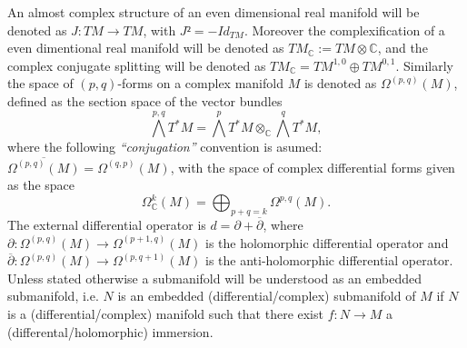 \documentclass[12pt,twoside,a4paper]{report}
\newcommand{\co}{\ensuremath{\mathbb C }}
\newcommand{\om}{\ensuremath{\Omega}}
\begin{document}
An almost complex structure of an even dimensional real manifold will be denoted as $J:TM\rightarrow TM$, with $J²=-Id_{TM}$. Moreover the complexification of a even dimentional real manifold will be denoted as $TM_{\co}:=TM\otimes\co$, and the complex conjugate splitting will be denoted as $TM_{\co}=TM^{1,0}\oplus TM^{0,1}$.
Similarly the space of $(p,q)$-forms on a complex manifold $M$ is denoted as $\Omega^{(p,q)}(M)$, defined as the section space of the vector bundles
\[
  \bigwedge^{p,q}T^{*}M=\bigwedge^{p}T^{*}M\otimes_{\co}\bigwedge^{q}T^{*}M,
\]
\noindent where the following \emph{``conjugation''} convention is asumed: $\overline{\om^{(p,q)}(M)}=\om^{(q,p)}(M)$, with the space of complex differential forms given as the space
\[
  \om^{k}_{\co}(M)=\bigoplus_{p+q=k}\om^{p,q}(M).
\]
\noindent The external differential operator is $d=\partial + \overline{\partial}$, where $\partial:\om^{(p,q)}(M)\rightarrow \om^{(p+1,q)}(M)$ is the holomorphic differential operator and $\overline{\partial}:\om^{(p,q)}(M)\rightarrow\om^{(p,q+1)}(M)$ is the anti-holomorphic differential operator.\\
Unless stated otherwise a submanifold will be understood as an embedded submanifold, i.e. $N$ is an embedded (differential/complex) submanifold of $M$ if $N$ is a (differential/complex) manifold such that there exist $f:N\rightarrow M$ a (differental/holomorphic) immersion.
\end{document}
